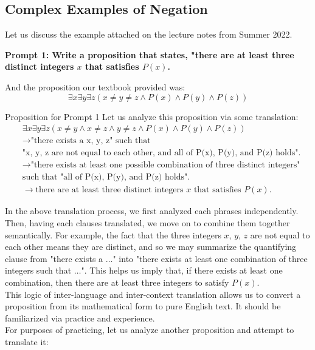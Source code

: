 \subsection{Complex Examples of Negation}
Let us discuss the example attached on the lecture notes from Summer 2022.
\begin{center}
    \textbf{Prompt 1: Write a proposition that states, "there are at least three distinct integers $x$ that satisfies $P(x)$.}
\end{center}
And the proposition our textbook provided was:
\[\exists x \exists y \exists z (x \neq y \neq z \land P(x) \land P(y) \land P(z))\]
\begin{ln-think}{Proposition for Prompt 1}{}
    Let us analyze this proposition via some translation:
    \begin{align*}
        &\exists x \exists y \exists z (x \neq y \land x \neq z \land y \neq z \land P(x) \land P(y) \land P(z)) \\
        &\rightarrow \text{"there exists a x, y, z" such that} \\
        & \text{"x, y, z are not equal to each other, and all of P(x), P(y), and P(z) holds".} \\
        &\rightarrow \text{"there exists at least one possible combination of three distinct integers"} \\
        & \text{such that "all of P(x), P(y), and P(z) holds".} \\
        &\rightarrow \text{there are at least three distinct integers $x$ that satisfies $P(x)$.}
    \end{align*}
\end{ln-think}
In the above translation process, we first analyzed each phrases independently. Then, having each clauses translated, we move on to combine them together semantically. For example, the fact that the three integers $x$, $y$, $z$ are not equal to each other means they are distinct, and so we may summarize the quantifying clause from "there exists a $\dots$" into "there exists at least one combination of three integers such that $\dots$". This helps us imply that, if there exists at least one combination, then there are at least three integers to satisfy $P(x)$. \\
This logic of inter-language and inter-context translation allows us to convert a proposition from its mathematical form to pure English text. It should be familiarized via practice and experience. \\
For purposes of practicing, let us analyze another proposition and attempt to translate it:
